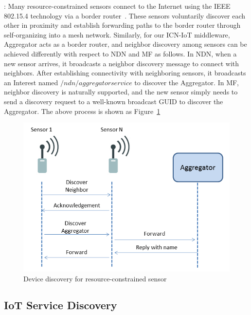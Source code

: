 \vspace{1mm}: Many resource-constrained sensors connect to the Internet using the IEEE 802.15.4 technology via a border router~\cite{hui2008ip}. These sensors voluntarily discover each other in proximity and establish forwarding paths to the border router through self-organizing into a mesh network. Similarly, for our ICN-IoT middleware,  Aggregator acts as a border router, and neighbor discovery among sensors can be achieved differently with respect to NDN and MF as follows. In NDN, when a new sensor arrives, it broadcasts a neighbor discovery message to connect with neighbors. After establishing connectivity with neighboring sensors, it broadcasts an Interest named $/ndn/aggregatorservice$ to discover the Aggregator. In MF, neighbor discovery is naturally supported, and the new sensor simply needs to send a discovery request to a well-known broadcast GUID to discover the Aggregator. %
The above process is shown as Figure~\ref{fig:device_dis} 
\begin{figure}
\includegraphics[width=\columnwidth]{figure/device_discovery.png}
\caption{\label{fig:device_dis}Device discovery for resource-constrained sensor}
\end{figure}



\subsection{IoT Service Discovery}

